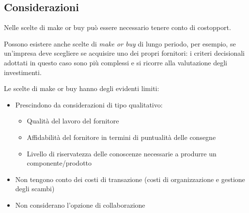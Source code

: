 \subsection{Considerazioni}
Nelle scelte di make or buy può essere necessario tenere conto di \gls{costopport}.

Possono esistere anche scelte di \emph{make or buy} di lungo periodo, per esempio, se un’impresa deve scegliere se acquisire uno dei propri fornitori: i criteri decisionali adottati in questo caso sono più complessi e si ricorre alla valutazione
degli investimenti.

Le scelte di make or buy hanno degli evidenti limiti:
\begin{itemize}
	\item Prescindono da considerazioni di tipo qualitativo:
	\begin{itemize}
		\item Qualità del lavoro del fornitore
		\item Affidabilità del fornitore in termini di puntualità delle consegne
		\item Livello di riservatezza delle conoscenze necessarie a produrre un
		componente/prodotto
	\end{itemize}
	\item Non tengono conto dei costi di transazione (costi di organizzazione e gestione
	degli scambi)
	\item Non considerano l’opzione di collaborazione
\end{itemize}

